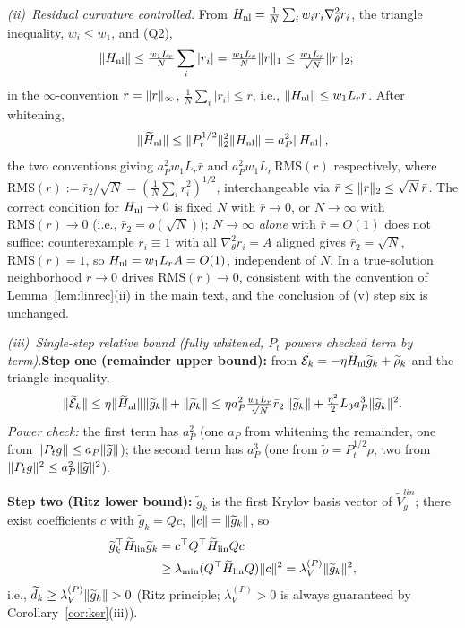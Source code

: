 \documentclass[11pt]{article}
\DeclarePairedDelimiter{\norm}{\lVert}{\rVert}
\newcommand{\Erem}{\mathcal E}
\newcommand{\wt}[1]{\widetilde{#1}}
\numberwithin{equation}{section}
\begin{document}
\medskip
\emph{(ii)~Residual curvature controlled.} From $H_{\rm nl}=\tfrac1N\sum_iw_ir_i\nabla_\theta^2r_i$, the triangle inequality, $w_i\le w_1$, and (Q2),
\begin{align}
\norm{H_{\rm nl}}
&\le\tfrac{w_1L_r}{N}\sum_i|r_i|
=\tfrac{w_1L_r}{N}\norm r_1
\le\tfrac{w_1L_r}{\sqrt N}\norm r_2;
\end{align}
in the $\infty$-convention $\bar r=\norm r_\infty$, $\tfrac1N\sum_i|r_i|\le\bar r$, i.e., $\norm{H_{\rm nl}}\le w_1L_r\bar r$. After whitening,
\begin{equation}
\norm{\wt H_{\rm nl}}\le\norm{P_t^{1/2}}_2^2\norm{H_{\rm nl}}=a_P^2\norm{H_{\rm nl}},
\end{equation}
the two conventions giving $a_P^2w_1L_r\bar r$ and $a_P^2w_1L_r\,\mathrm{RMS}(r)$ respectively, where $\mathrm{RMS}(r):=\bar r_2/\sqrt N=(\tfrac1N\sum_i r_i^2)^{1/2}$, interchangeable via $\bar r\le\norm r_2\le\sqrt N\,\bar r$. The correct condition for $H_{\rm nl}\to0$ is fixed $N$ with $\bar r\to0$, or $N\to\infty$ with $\mathrm{RMS}(r)\to0$ (i.e., $\bar r_2=o(\sqrt N)$); $N\to\infty$ \emph{alone} with $\bar r=O(1)$ does not suffice: counterexample $r_i\equiv1$ with all $\nabla_\theta^2r_i=A$ aligned gives $\bar r_2=\sqrt N$, $\mathrm{RMS}(r)=1$, so $H_{\rm nl}=w_1L_rA=O(1)$, independent of $N$. In a true-solution neighborhood $\bar r\to0$ drives $\mathrm{RMS}(r)\to0$, consistent with the convention of Lemma~\ref{lem:linrec}(ii) in the main text, and the conclusion of (v) step six is unchanged.

\medskip
\emph{(iii)~Single-step relative bound (fully whitened, $P_t$ powers checked term by term).}\textbf{Step one (remainder upper bound):} from $\wt\Erem_k=-\eta\wt H_{\rm nl}\wt g_k+\wt\rho_k$ and the triangle inequality,
\begin{equation}
\norm{\wt\Erem_k}\le\eta\norm{\wt H_{\rm nl}}\norm{\wt g_k}+\norm{\wt\rho_k}
\le\eta a_P^2\tfrac{w_1L_r}{\sqrt N}\bar r_2\,\norm{\wt g_k}
+\tfrac{\eta^2}{2}L_3a_P^3\norm{\wt g_k}^2.
\end{equation}
\emph{Power check:} the first term has $a_P^2$ (one $a_P$ from whitening the remainder, one from $\norm{P_tg}\le a_P\norm{\wt g}$); the second term has $a_P^3$ (one from $\wt\rho=P_t^{1/2}\rho$, two from $\norm{P_tg}^2\le a_P^2\norm{\wt g}^2$).

\noindent\textbf{Step two (Ritz lower bound):} $\wt g_k$ is the first Krylov basis vector of $\wt V_g^{lin}$; there exist coefficients $c$ with $\wt g_k=Qc$, $\norm c=\norm{\wt g_k}$, so
\begin{align}
\wt g_k^\top\wt H_{\rm lin}\wt g_k
&=c^\top Q^\top\wt H_{\rm lin}Qc\notag\\
&\ge\lambda_{\min}(Q^\top\wt H_{\rm lin}Q)\norm c^2
=\lambda_V^{(P)}\norm{\wt g_k}^2,
\end{align}
i.e., $\wt d_k\ge\lambda_V^{(P)}\norm{\wt g_k}>0$ (Ritz principle; $\lambda_V^{(P)}>0$ is always guaranteed by Corollary~\ref{cor:ker}(iii)).
\end{document}

